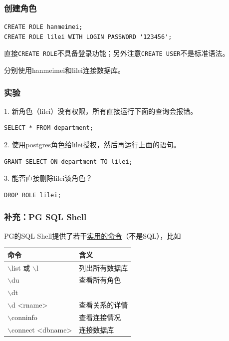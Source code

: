 \documentclass[aspectratio=169, 14pt]{beamer}
\begin{document}
\begin{frame}[fragile]
    \frametitle{创建角色}

    \begin{verbatim}
CREATE ROLE hanmeimei;
CREATE ROLE lilei WITH LOGIN PASSWORD '123456';
    \end{verbatim}
直接\texttt{CREATE ROLE}不具备登录功能；另外注意\texttt{CREATE USER}不是标准语法。

 分别使用hanmeimei和lilei连接数据库。
\end{frame}

\begin{frame}[fragile]
    \frametitle{实验}
1. 新角色（lilei）没有权限，所有直接运行下面的查询会报错。
\begin{verbatim}
SELECT * FROM department;
\end{verbatim}
2. 使用postgres角色给lilei授权，然后再运行上面的语句。
\begin{verbatim}
GRANT SELECT ON department TO lilei;
\end{verbatim}
3. 能否直接删除lilei该角色？
\begin{verbatim}
DROP ROLE lilei;
\end{verbatim}

\end{frame}

\begin{frame}
    \frametitle{补充：PG SQL Shell}
PG的SQL Shell提供了若干\href{https://www.postgresql.org/docs/current/app-psql.html}{实用的命令}（不是SQL），比如

\begin{table}
    \begin{tabular}{ll}
      \toprule
      命令 & 含义 \\
      \midrule
      $\backslash$list 或 $\backslash$l & 列出所有数据库 \\
      $\backslash$du & 查看所有角色 \\
      $\backslash$dt & \\
      $\backslash$d <rname> & 查看关系的详情 \\
      $\backslash$conninfo & 查看连接情况 \\ 
      $\backslash$connect <dbname> & 连接数据库 \\
      \bottomrule
    \end{tabular}
\end{table}

\end{frame}
\end{document}
